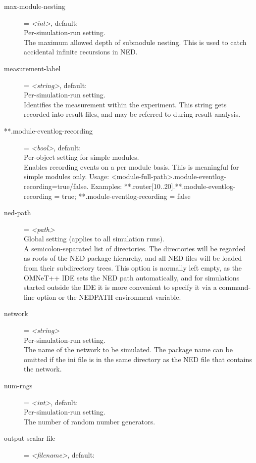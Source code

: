 \begin{description}
\item[max-module-nesting] = \textit{<int>}, default: \\
    Per-simulation-run setting.\\
    The maximum allowed depth of submodule nesting. This is used to catch
    accidental infinite recursions in NED.
\item[measurement-label] = \textit{<string>}, default: \\
    Per-simulation-run setting.\\
    Identifies the measurement within the experiment. This string gets recorded
    into result files, and may be referred to during result analysis.
\item[**.module-eventlog-recording] = \textit{<bool>}, default: \\
    Per-object setting for simple modules.\\
    Enables recording events on a per module basis. This is meaningful for
    simple modules only. Usage:
    <module-full-path>.module-eventlog-recording=true/false. Examples:
    **.router[10..20].**.module-eventlog-recording = true;
    **.module-eventlog-recording = false
\item[ned-path] = \textit{<path>}\\
    Global setting (applies to all simulation runs).\\
    A semicolon-separated list of directories. The directories will be regarded
    as roots of the NED package hierarchy, and all NED files will be loaded
    from their subdirectory trees. This option is normally left empty, as the
    OMNeT++ IDE sets the NED path automatically, and for simulations started
    outside the IDE it is more convenient to specify it via a command-line
    option or the NEDPATH environment variable.
\item[network] = \textit{<string>}\\
    Per-simulation-run setting.\\
    The name of the network to be simulated.  The package name can be omitted
    if the ini file is in the same directory as the NED file that contains the
    network.
\item[num-rngs] = \textit{<int>}, default: \\
    Per-simulation-run setting.\\
    The number of random number generators.
\item[output-scalar-file] = \textit{<filename>}, default: \\

\end{description}
